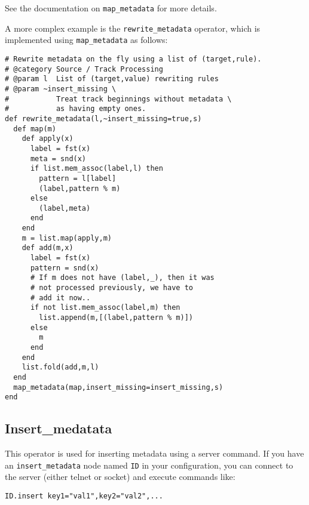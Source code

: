 See the documentation on \verb+map_metadata+ for more details.

A more complex example is the \verb+rewrite_metadata+ operator, which is implemented using \verb+map_metadata+ as follows:

\begin{verbatim}
# Rewrite metadata on the fly using a list of (target,rule).
# @category Source / Track Processing
# @param l  List of (target,value) rewriting rules
# @param ~insert_missing \
#           Treat track beginnings without metadata \
#           as having empty ones.
def rewrite_metadata(l,~insert_missing=true,s)
  def map(m)
    def apply(x)
      label = fst(x)
      meta = snd(x)
      if list.mem_assoc(label,l) then
        pattern = l[label]
        (label,pattern % m)
      else
        (label,meta)
      end
    end
    m = list.map(apply,m)
    def add(m,x)
      label = fst(x)
      pattern = snd(x)
      # If m does not have (label,_), then it was
      # not processed previously, we have to
      # add it now..
      if not list.mem_assoc(label,m) then
        list.append(m,[(label,pattern % m)])
      else
        m
      end
    end
    list.fold(add,m,l)
  end
  map_metadata(map,insert_missing=insert_missing,s)
end
\end{verbatim}
\subsection{Insert\_medatata}
This operator is used for inserting metadata using a server command. If you have an \verb+insert_metadata+ node named \verb+ID+ in your configuration, you can connect to the server (either telnet or socket) and execute commands like: 

\begin{verbatim}
ID.insert key1="val1",key2="val2",...
\end{verbatim}
